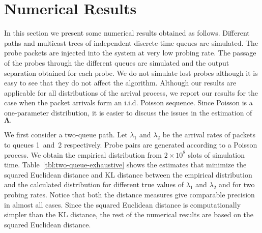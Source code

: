 \documentclass[11pt]{article}
\begin{document}
\section{Numerical Results}
\label{sec:numerical-results}
In this section we present some numerical results obtained as follows.
Different paths and multicast trees of independent discrete-time
queues are simulated. The probe packets are injected into the system
at very low probing rate. The passage of the probes through the
different queues are simulated and the output separation obtained for
each probe. We do not simulate lost probes although it is easy to see
that they do not affect the algorithm.
Although our results are
applicable for all distributions of the arrival process, we report our
results for the case when the packet arrivals form an i.i.d. Poisson
sequence.  Since Poisson is a one-parameter distribution, it is easier
to discuss the issues in the estimation of $\mathbf{\Lambda}.$

We first consider a two-queue path. Let $\lambda_1$ and $\lambda_2$ be
the arrival rates of packets to queues 1~and~2 respectively. Probe
pairs are generated according to a Poisson process. We obtain the
empirical distribution from $2 \times 10^8$ slots of simulation time.
Table~\ref{tbl:two-queue-exhaustive} shows the estimates that minimize
the squared Euclidean distance and KL distance between the empirical
distribution and the calculated distribution for different true values
of $\lambda_1$ and $\lambda_2$ and for two probing rates.  Notice that
both the distance measures give comparable precision in almost all
cases. Since the squared Euclidean distance is computationally simpler
than the KL distance, the rest of the numerical results are based on
the squared Euclidean distance.
\end{document}

